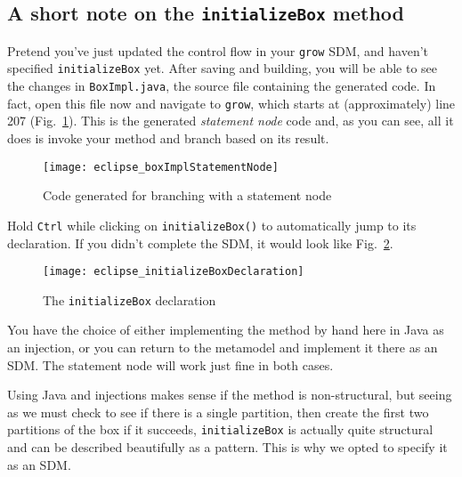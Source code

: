 \newpage
\hypertarget{initialize notes}{}
\subsection{A short note on the \texttt{initializeBox} method}
\genHeader

Pretend you've just updated the control flow in your \texttt{grow} SDM, and haven't specified \texttt{initializeBox} yet. After saving and building, you will be
able to see the changes in \texttt{BoxImpl.java}, the source file containing the generated code. In fact, open this file now and navigate to \texttt{grow},
which starts at (approximately) line 207 (Fig.~\ref{eclipse:initBoxImpl}). This is the generated \emph{statement node} code and, as you can see, all it does is
invoke your method and branch based on its result. 

\begin{figure}[htp]
\begin{center}
  \texttt{[image: eclipse\_boxImplStatementNode]}
  \caption{Code generated for branching with a statement node}
  \label{eclipse:initBoxImpl}
\end{center}
\end{figure}

Hold \texttt{Ctrl} while clicking on \texttt{initializeBox()} to automatically
jump to its declaration.
If you didn't complete the SDM, it would look like Fig.~\ref{eclipse:initBoxDecl}.

\begin{figure}[htp]
\begin{center}
  \texttt{[image: eclipse\_initializeBoxDeclaration]}
  \caption{The \texttt{initializeBox} declaration}
  \label{eclipse:initBoxDecl}
\end{center}
\end{figure}

You have the choice of either implementing the method by hand here in Java as an injection, or you can return to the metamodel and implement it there as an SDM.
The statement node will work just fine in both cases.

Using Java and injections makes sense if the method is non-structural, but seeing as we must check to see if there is a single partition, then create the
first two partitions of the box if it succeeds, \texttt{initializeBox} is actually quite structural and can be described beautifully as a pattern. This is why
we opted to specify it as an SDM.

